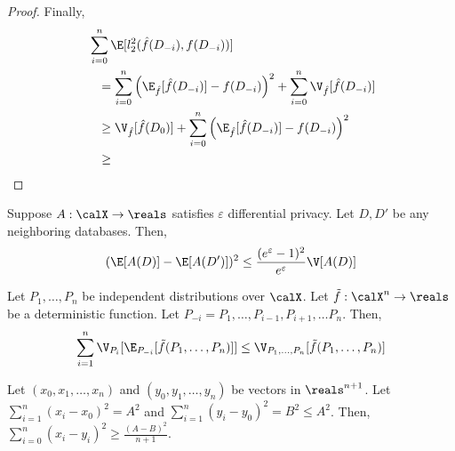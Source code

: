 \begin{proof}
  Finally,
  \begin{align*}
    &\:\sum_{i=0}^n \E[l_2^2(\hat{f}(D_{-i}), f(D_{-i}))] \\ 
    &\hspace{1em} = \sum_{i=0}^n
    \left(\E_{\hat{f}}[\hat{f}(D_{-i})] - f(D_{-i}) \right)^2 
        + \sum_{i=0}^n \V_{\hat{f}}[\hat{f}(D_{-i})] \\
    &\hspace{1em} \geq \V_{\hat{f}}[\hat{f}(D_{0})] + \sum_{i=0}^n 
    \left(\E_{\hat{f}}[\hat{f}(D_{-i})] - f(D_{-i}) \right)^2 \\
    &\hspace{1em} \geq 
  \end{align*}
\end{proof} 

\begin{lemma}\label{lem:var-lb}
  Suppose $A : \calX \rightarrow \reals$ satisfies $\varepsilon$ differential privacy.
  Let $D,D'$ be any neighboring databases. Then,
  \[
    (\E[A(D)] - \E[A(D')])^2 \leq
    \frac{(e^\varepsilon-1)^2}{e^\varepsilon}\V[A(D)]
  \]
\end{lemma}

\begin{lemma}\label{lem:var-lb}
  Let $P_1,\ldots, P_n$ be independent distributions over $\calX$. Let
  $\tilde{f} : \calX^n \rightarrow \reals$ be a deterministic function. 
  Let $P_{-i} = P_1,\ldots, P_{i-1}, P_{i+1},\ldots P_n$. 
  Then,
  \[
    \sum_{i=1}^n \V_{P_i}[\E_{P_{-i}}[\tilde{f}(P_1,\ldots, P_n)]] \leq
    \V_{P_1,\ldots, P_n}[\tilde{f}(P_1,\ldots, P_n)]
  \]
\end{lemma}

\begin{lemma}\label{lem:vec-lb}
  Let $(x_0,x_1,\ldots, x_n)$ and $(y_0,y_1,\ldots, y_n)$ be vectors in
  $\reals^{n+1}$. Let $\sum_{i=1}^n (x_i-x_0)^2 = A^2$ and $\sum_{i=1}^n
  (y_i-y_0)^2 = B^2 \leq A^2$. Then, $\sum_{i=0}^n (x_i-y_i)^2 \geq
  \frac{(A-B)^2}{n+1}$.
\end{lemma}
